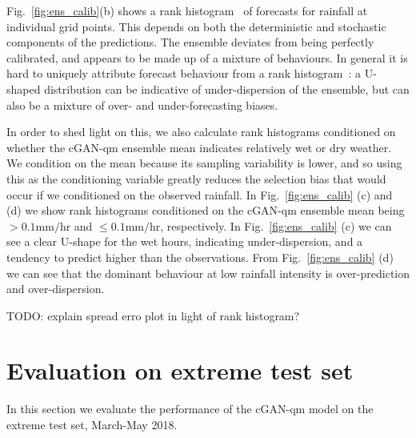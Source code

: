 \documentclass{article}
\begin{document}
Fig.~\ref{fig:ens_calib}(b) shows a rank histogram~\citep{wilks_forecast_2019} of forecasts for rainfall at individual grid points. This depends on both the deterministic and stochastic components of the predictions. The ensemble deviates from being perfectly calibrated, and appears to be made up of a mixture of behaviours. In general it is hard to uniquely attribute forecast behaviour from a rank histogram~\citep{hamill_interpretation_2001}: a U-shaped distribution can be indicative of under-dispersion of the ensemble, but can also be a mixture of over- and under-forecasting biases. 

In order to shed light on this, we also calculate rank histograms conditioned on whether the cGAN-qm ensemble mean indicates relatively wet or dry weather. We condition on the mean because its sampling variability is lower, and so using this as the conditioning variable greatly reduces the selection bias that would occur if we conditioned on the observed rainfall. In Fig.~\ref{fig:ens_calib} (c) and (d) we show rank histograms conditioned on the cGAN-qm ensemble mean being $>0.1\text{mm/hr}$ and $\leq 0.1\text{mm/hr}$, respectively. In Fig.~\ref{fig:ens_calib} (c) we can see a clear U-shape for the wet hours, indicating under-dispersion, and a tendency to predict higher than the observations. From Fig.~\ref{fig:ens_calib} (d) we can see that the dominant behaviour at low rainfall intensity is over-prediction and over-dispersion. 

TODO: explain spread erro plot in light of rank histogram?


\section{Evaluation on extreme test set}

In this section we evaluate the performance of the cGAN-qm model on the extreme test set, March-May 2018.
\end{document}
